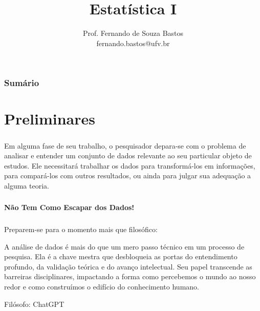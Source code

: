 \documentclass[12pt]{beamer}
\title{Estatística I}
\author{Prof. Fernando de Souza Bastos\texorpdfstring{\\ fernando.bastos@ufv.br}{}}
\institute{Departamento de Estatística\texorpdfstring{\\ Universidade Federal de Viçosa}{}\texorpdfstring{\\ Campus UFV - Viçosa}{}}
\date{}
\begin{document}

\frame{\titlepage}

\begin{frame}{}
\frametitle{\bf Sumário}
\tableofcontents
\end{frame}

\section{Preliminares}
\begin{frame}{}
\frametitle{}
\begin{block}{}
\justifying
Em alguma fase de seu trabalho, o pesquisador depara-se com o problema de analisar e entender um conjunto de dados relevante ao seu particular objeto de estudos. Ele necessitará trabalhar os dados para transformá-los em informações, para compará-los com outros resultados, ou ainda para julgar sua adequação a alguma teoria.
\end{block}
\end{frame}

\begin{frame}{}
\frametitle{}
\begin{block}{}
\justifying
\begin{center}
\Large{\bf{Não Tem Como Escapar dos Dados!}}
\end{center}
\end{block}
\end{frame}

\begin{frame}{}
\frametitle{}
\begin{block}{}
\justifying
Preparem-se para o momento mais que filosófico:
\end{block}
\pause
\begin{block}{}
\justifying
A análise de dados é mais do que um mero passo técnico em um processo de pesquisa. Ela é a chave mestra que desbloqueia as portas do entendimento profundo, da validação teórica e do avanço intelectual. Seu papel transcende as barreiras disciplinares, impactando a forma como percebemos o mundo ao nosso redor e como construímos o edifício do conhecimento humano.
\pause
\begin{flushright}
 Filósofo: ChatGPT
\end{flushright}
\end{block}
\end{frame}
\end{document}
